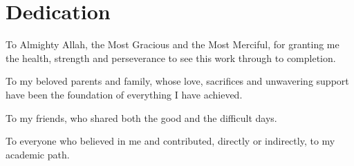 \chapter*{Dedication}


\vspace{1cm}

\begin{center}
\begin{minipage}{0.82\textwidth}

To Almighty Allah, the Most Gracious and the Most Merciful, for granting me the
health, strength and perseverance to see this work through to completion.

\medskip
To my beloved parents and family, whose love, sacrifices and unwavering support
have been the foundation of everything I have achieved.

\medskip
To my friends, who shared both the good and the difficult days.

\medskip
To everyone who believed in me and contributed, directly or indirectly, to my
academic path.

\vspace{1.2cm}
\hfill\textit{\thesisstudentone}

\end{minipage}
\end{center}
